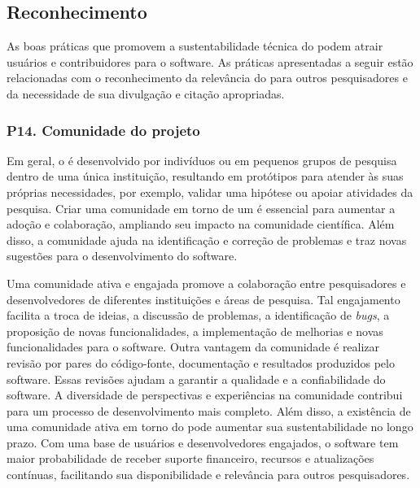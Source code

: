 \subsection{Reconhecimento}

As boas práticas que promovem a sustentabilidade técnica do \RSw podem atrair usuários e contribuidores para o software.
%
As práticas apresentadas a seguir estão relacionadas com o reconhecimento da relevância do \RSw para outros pesquisadores e da necessidade de sua divulgação e citação apropriadas.

\subsubsection*{P14. Comunidade do projeto} 

Em geral, o \RSw é desenvolvido por indivíduos ou em pequenos grupos de pesquisa dentro de uma única instituição, resultando em protótipos para atender às suas próprias necessidades, por exemplo, validar uma hipótese ou apoiar atividades da pesquisa.
%
Criar uma comunidade em torno de um \RSw é essencial para aumentar a adoção e colaboração, ampliando seu impacto na comunidade científica. 
Além disso, a comunidade ajuda na identificação e correção de problemas e traz novas sugestões para o desenvolvimento do software. 

Uma comunidade ativa e engajada promove a colaboração entre pesquisadores e desenvolvedores de diferentes instituições e áreas de pesquisa. Tal engajamento facilita a troca de ideias, a discussão de problemas, a identificação de \textit{bugs}, a proposição de novas funcionalidades, a implementação de melhorias e novas funcionalidades para o software. 
Outra vantagem da comunidade é realizar revisão por pares do código-fonte, documentação e resultados produzidos pelo software. Essas revisões ajudam a garantir a qualidade e a confiabilidade do software. A diversidade de perspectivas e experiências na comunidade contribui para um processo de desenvolvimento mais completo. Além disso, a existência de uma comunidade ativa em torno do \RSw pode aumentar sua sustentabilidade no longo prazo. 
Com uma base de usuários e desenvolvedores engajados, o software tem maior probabilidade de receber suporte financeiro, recursos e atualizações contínuas, facilitando sua disponibilidade e relevância para outros pesquisadores.


